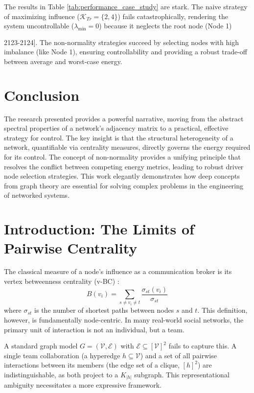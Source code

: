 \documentclass[11pt, a4paper]{article}
\begin{document}
The results in Table \ref{tab:performance_case_study} are stark. The naive strategy of maximizing influence ($\mathcal{K}_{Tr}=\{2,4\}$) fails catastrophically, rendering the system uncontrollable ($\lambda_{\min}=0$) because it neglects the root node (Node 1) {2123-2124]. The non-normality strategies succeed by selecting nodes with high imbalance (like Node 1), ensuring controllability and providing a robust trade-off between average and worst-case energy.

\section{Conclusion}
The research presented provides a powerful narrative, moving from the abstract spectral properties of a network's adjacency matrix to a practical, effective strategy for control. The key insight is that the structural heterogeneity of a network, quantifiable via centrality measures, directly governs the energy required for its control. The concept of non-normality provides a unifying principle that resolves the conflict between competing energy metrics, leading to robust driver node selection strategies. This work elegantly demonstrates how deep concepts from graph theory are essential for solving complex problems in the engineering of networked systems.

\section{Introduction: The Limits of Pairwise Centrality}
The classical measure of a node's influence as a communication broker is its vertex betweenness centrality (v-BC) \cite{1359-1360}:
\begin{equation}
    B(v_i) = \sum_{s \neq v_i \neq t} \frac{\sigma_{st}(v_i)}{\sigma_{st}}
\end{equation}
where $\sigma_{st}$ is the number of shortest paths between nodes $s$ and $t$. This definition, however, is fundamentally node-centric. In many real-world social networks, the primary unit of interaction is not an individual, but a team.

A standard graph model $G=(\mathcal{V}, \mathcal{E})$ with $\mathcal{E} \subseteq [\mathcal{V}]^2$ fails to capture this. A single team collaboration (a hyperedge $h \subseteq \mathcal{V}$) and a set of all pairwise interactions between its members (the edge set of a clique, $[h]^2$) are indistinguishable, as both project to a $K_{|h|}$ subgraph. This representational ambiguity necessitates a more expressive framework.

}
\end{document}
